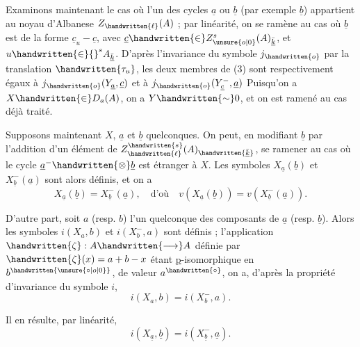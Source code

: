 
Examinons maintenant le cas où l'un des cycles $\underline{a}$ ou $\underline{b}$ (par exemple $\underline{b}$) appartient au noyau d'Albanese $Z_{\handwritten{\ell}}(A)$ ; par linéarité, on se ramène au cas où $\underline{b}$ est de la forme $\underline{c}_u-\underline{c}$, avec $\underline{c}\handwritten{\in}Z^{s}_{\unsure{o|0}}(A)_{\bar{\underline{k}}}$, et $u\handwritten{\in}{}^{s}A_{\bar{\underline{k}}}$. D'après l'invariance du symbole $j_{\handwritten{o}}$ par la translation $\handwritten{\tau_u}$, les deux membres de (3) sont respectivement égaux à $j_{\handwritten{o}}(Y_{\underline{a}},\underline{c})$ et à $j_{\handwritten{o}}(Y^{-}_{\underline{c}},\underline{a})$ Puisqu'on a $X\handwritten{\in}D_a(A)$, on a $Y\handwritten{\sim}0$, et on est ramené au cas déjà traité.

Supposons maintenant $X$, $\underline{a}$ et $\underline{b}$ quelconques. On peut, en modifiant $\underline{b}$ par l'addition d'un élément de $Z^{\handwritten{s}}_{\handwritten{\ell}}(A)_{\handwritten{\bar{\underline{k}}}}$, se ramener au cas où le cycle $\underline{a}^{-}\handwritten{\otimes}\underline{b}$ est étranger à $X$. Les symboles $X_{\underline{a}}(\underline{b})$ et $X^{-}_{\underline{b}}(\underline{a})$ sont alors définis, et on a
\[
X_{\underline{a}}(\underline{b})=X^{-}_{\underline{b}}(\underline{a}),\quad\text{d'où}\quad v(X_{\underline{a}}(\underline{b}))=v(X^{-}_{\underline{b}}(\underline{a})).
\]

D'autre part, soit $a$ (resp. $b$) l'un quelconque des composants de $\underline{a}$ (resp. $\underline{b}$). Alors les symboles $i(X_a,b)$ et $i(X^{-}_b,a)$ sont définis ; l'application $\handwritten{\zeta}:A\handwritten{\longrightarrow}A$ définie par $\handwritten{\zeta}(x)=a+b-x$ étant \uline{p}-isomorphique en $b^{\handwritten{\unsure{\circ|o|0}}}$, de valeur $a^{\handwritten{\circ}}$, on a, d'après la propriété d'invariance du symbole $i$,
\[
i(X_a,b)=i(X^{-}_b,a).
\]

Il en résulte, par linéarité,
\[
i(X_{\underline{a}},\underline{b})=i(X^{-}_{\underline{b}},\underline{a}).
\]

